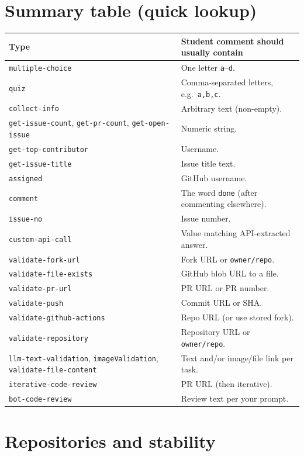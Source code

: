 \documentclass[11pt,a4paper]{article}
\newcommand{\field}[1]{\texttt{#1}}
\begin{document}
\section{Summary table (quick lookup)}

{\footnotesize
\begin{tabularx}{\linewidth}{@{}lX@{}}
  \toprule
  \textbf{Type} & \textbf{Student comment should usually contain} \\
  \midrule
  \field{multiple-choice} & One letter \texttt{a}--\texttt{d}. \\
  \field{quiz} & Comma-separated letters, e.g.\ \texttt{a,b,c}. \\
  \field{collect-info} & Arbitrary text (non-empty). \\
  \field{get-issue-count}, \field{get-pr-count}, \field{get-open-issue} & Numeric string. \\
  \field{get-top-contributor} & Username. \\
  \field{get-issue-title} & Issue title text. \\
  \field{assigned} & GitHub username. \\
  \field{comment} & The word \texttt{done} (after commenting elsewhere). \\
  \field{issue-no} & Issue number. \\
  \field{custom-api-call} & Value matching API-extracted answer. \\
  \field{validate-fork-url} & Fork URL or \texttt{owner/repo}. \\
  \field{validate-file-exists} & GitHub blob URL to a file. \\
  \field{validate-pr-url} & PR URL or PR number. \\
  \field{validate-push} & Commit URL or SHA. \\
  \field{validate-github-actions} & Repo URL (or use stored fork). \\
  \field{validate-repository} & Repository URL or \texttt{owner/repo}. \\
  \field{llm-text-validation}, \field{imageValidation}, \field{validate-file-content} & Text and/or image/file link per task. \\
  \field{iterative-code-review} & PR URL (then iterative). \\
  \field{bot-code-review} & Review text per your prompt. \\
  \bottomrule
\end{tabularx}
}

\section{Repositories and stability}
\end{document}
